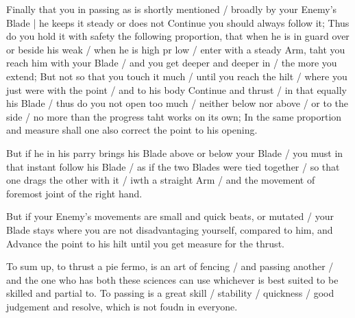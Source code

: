Finally that you in passing as is shortly mentioned / broadly by your
Enemy's Blade | he keeps it steady or does not Continue you should
always follow it; Thus do you hold it with safety the following
proportion, that when he is in guard over or beside his weak / when he
is high pr low / enter with a steady Arm, taht you reach him with your
Blade / and you get deeper and deeper in / the more you extend; But
not so that you touch it much / until you reach the hilt / where you
just were with the point / and to his body Continue and thrust / in
that equally his Blade / thus do you not open too much / neither below
nor above / or to the side / no more than the progress taht works on
its own; In the same proportion and measure shall one also correct the
point to his opening.


But if he in his parry brings his Blade above or below your Blade /
you must in that instant follow his Blade / as if the two Blades were
tied together / so that one drags the other with it / iwth a straight
Arm / and the movement of foremost joint of the right hand.


But if your Enemy's movements are small and quick beats, or mutated /
your Blade stays where you are not disadvantaging yourself, compared
to him, and Advance the point to his hilt until you get measure for
the thrust.


To sum up, to thrust a pie fermo, is an art of fencing / and passing
another / and the one who has both these sciences can use whichever is
best suited to be skilled and partial to. To passing is a great skill
/ stability / quickness / good judgement and resolve, which is not
foudn in everyone.